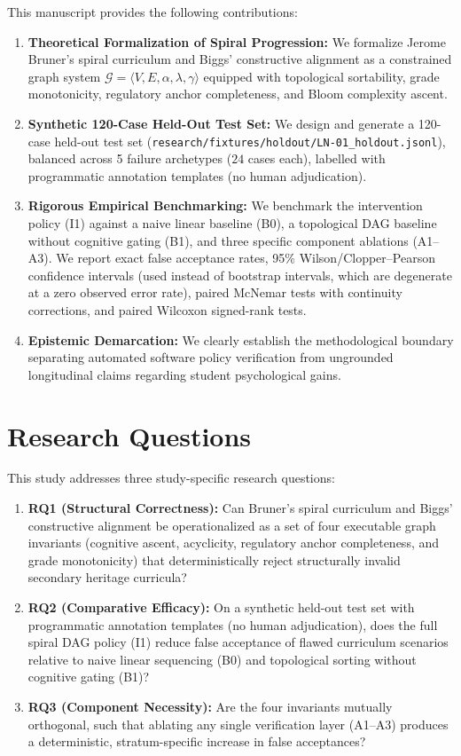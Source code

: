 \documentclass[11pt,a4paper]{article}
\begin{document}
This manuscript provides the following contributions:
\begin{enumerate}
    \item \textbf{Theoretical Formalization of Spiral Progression:} We formalize Jerome Bruner's spiral curriculum and Biggs' constructive alignment as a constrained graph system $\mathcal{G} = \langle V, E, \alpha, \lambda, \gamma \rangle$ equipped with topological sortability, grade monotonicity, regulatory anchor completeness, and Bloom complexity ascent.
    \item \textbf{Synthetic 120-Case Held-Out Test Set:} We design and generate a 120-case held-out test set (\texttt{research/fixtures/holdout/LN-01\_holdout.jsonl}), balanced across 5 failure archetypes ($24$ cases each), labelled with programmatic annotation templates (no human adjudication).
    \item \textbf{Rigorous Empirical Benchmarking:} We benchmark the intervention policy (I1) against a naive linear baseline (B0), a topological DAG baseline without cognitive gating (B1), and three specific component ablations (A1--A3). We report exact false acceptance rates, 95\% Wilson/Clopper--Pearson confidence intervals (used instead of bootstrap intervals, which are degenerate at a zero observed error rate), paired McNemar tests with continuity corrections, and paired Wilcoxon signed-rank tests.
    \item \textbf{Epistemic Demarcation:} We clearly establish the methodological boundary separating automated software policy verification from ungrounded longitudinal claims regarding student psychological gains.
\end{enumerate}


\section{Research Questions}

This study addresses three study-specific research questions:

\begin{enumerate}[label=\textbf{RQ\arabic*}, leftmargin=2.4em]
    \item \textbf{RQ1 (Structural Correctness):} Can Bruner's spiral curriculum and Biggs' constructive alignment be operationalized as a set of four executable graph invariants (cognitive ascent, acyclicity, regulatory anchor completeness, and grade monotonicity) that deterministically reject structurally invalid secondary heritage curricula?
    \item \textbf{RQ2 (Comparative Efficacy):} On a synthetic held-out test set with programmatic annotation templates (no human adjudication), does the full spiral DAG policy (I1) reduce false acceptance of flawed curriculum scenarios relative to naive linear sequencing (B0) and topological sorting without cognitive gating (B1)?
    \item \textbf{RQ3 (Component Necessity):} Are the four invariants mutually orthogonal, such that ablating any single verification layer (A1--A3) produces a deterministic, stratum-specific increase in false acceptances?
\end{enumerate}
\end{document}
